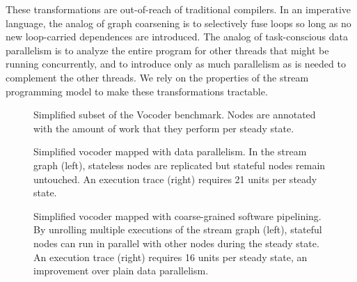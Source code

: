 These transformations are out-of-reach of traditional compilers.  In
an imperative language, the analog of graph coarsening is to
selectively fuse loops so long as no new loop-carried dependences are
introduced.  The analog of task-conscious data parallelism is to
analyze the entire program for other threads that might be running
concurrently, and to introduce only as much parallelism as is needed
to complement the other threads.  We rely on the properties of the
stream programming model to make these transformations tractable.

\begin{figure}[t]
\centering
{}
\caption[Simplified subset of the Vocoder benchmark]{Simplified subset
  of the Vocoder benchmark.  Nodes are annotated with the amount of
  work that they perform per steady state.\protect\label{fig:vocoder}}
\end{figure}

\begin{figure}[t]
\centering
{}
\caption[Coarse-grained data parallelism applied to
  Vocoder]{Simplified vocoder mapped with data parallelism.  In the
  stream graph (left), stateless nodes are replicated but stateful
  nodes remain untouched.  An execution trace (right) requires 21
  units per steady state.\protect\label{fig:vocoder-data}}
\end{figure}

\begin{figure}[t]
\centering
{}
\caption[Coarse-grained software pipelining applied to
  Vocoder]{Simplified vocoder mapped with coarse-grained software
  pipelining.  By unrolling multiple executions of the stream graph
  (left), stateful nodes can run in parallel with other nodes during
  the steady state.  An execution trace (right) requires 16 units per
  steady state, an improvement over plain data parallelism.
  \protect\label{fig:vocoder-swpipe}}
\end{figure}


